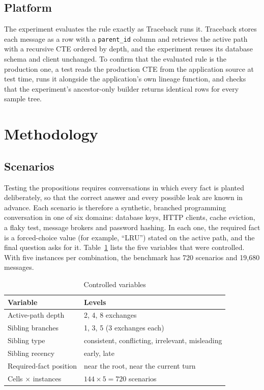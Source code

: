 \documentclass[conference]{IEEEtran}
\theoremstyle{definition}
\begin{document}
\subsection{Platform}

The experiment evaluates the rule exactly as Traceback runs it. Traceback stores each message as a row with a \texttt{parent\_id} column and retrieves the active path with a recursive CTE ordered by depth, and the experiment reuses its database schema and client unchanged. To confirm that the evaluated rule is the production one, a test reads the production CTE from the application source at test time, runs it alongside the application's own lineage function, and checks that the experiment's ancestor-only builder returns identical rows for every sample tree.

\section{Methodology}

\subsection{Scenarios}

Testing the propositions requires conversations in which every fact is planted deliberately, so that the correct answer and every possible leak are known in advance. Each scenario is therefore a synthetic, branched programming conversation in one of six domains: database keys, HTTP clients, cache eviction, a flaky test, message brokers and password hashing. In each one, the required fact is a forced-choice value (for example, ``LRU'') stated on the active path, and the final question asks for it. Table~\ref{tab:design} lists the five variables that were controlled. With five instances per combination, the benchmark has 720 scenarios and 19{,}680 messages.

\begin{table}[t]
\centering
\caption{Controlled variables}
\label{tab:design}
\footnotesize
\begin{tabular}{@{}lp{}@{}}
\toprule
Variable & Levels \\
\midrule
Active-path depth & 2, 4, 8 exchanges \\
Sibling branches & 1, 3, 5 (3 exchanges each) \\
Sibling type & consistent, conflicting, irrelevant, misleading \\
Sibling recency & early, late \\
Required-fact position & near the root, near the current turn \\
\midrule
Cells $\times$ instances & $144\times 5=720$ scenarios \\
\bottomrule
\end{tabular}
\end{table}
\end{document}
